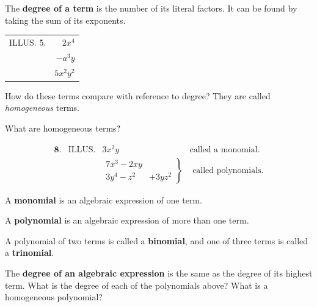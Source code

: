 \documentclass{book}
\begin{document}
The \textbf{ degree of a term} is the number of its literal
factors. It can be found by taking the sum of its exponents.

\begin{tabular}{lr}
ILLUS. 5. & $2x^4$ \\
& $-a^3y$\\
& $5x^2y^2$\\
\end{tabular}

How do these terms compare with reference to degree? They are
called \textit{homogeneous} terms.

What are homogeneous terms?

\[
\begin{array}{llll}
\textbf{8.}& \text{ILLUS.}& 3x^2y& \text{called a monomial.}\\
&& \left. \begin{array}{ll}
7x^3 - 2xy \\
3y^4 - z^2  & +3yz^2
\end{array} \right\}
& \text{ called polynomials.}
\end{array}
\]

A \textbf{monomial} is an algebraic expression of one term.

A \textbf{polynomial} is an algebraic expression of more
than one term.

A polynomial of two terms is called a \textbf{binomial}, and
one of three terms is called a \textbf{trinomial}.

The \textbf{degree of an algebraic expression} is the same
as the degree of its highest term. What is the degree
of each of the polynomials above? What is a homogeneous
polynomial?
\end{document}
